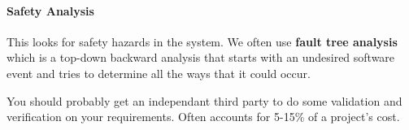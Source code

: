 \documentclass[12pt]{article}
\begin{document}
\paragraph{Safety Analysis} 
\label{par:safety_analysis}
This looks for safety hazards in the system. We often use \textbf{fault tree analysis} which is a top-down backward analysis that starts with an undesired software event and tries to determine all the ways that it could occur. 

You should probably get an independant third party to do some validation and verification on your requirements. Often accounts for 5-15\% of a project's cost. 
\end{document}
